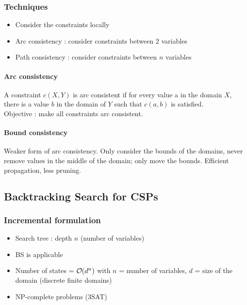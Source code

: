 \subsubsection{Techniques}

\begin{itemize}
\item Consider the constraints locally
\item Arc consistency : consider constraints between $2$ variables
\item Path consistency : consider constraints between $n$ variables
\end{itemize}

\paragraph{Arc consistency}

A constraint $c(X, Y)$ is arc consistent if for every value a in the domain $X$, there is a value $b$ in the domain of $Y$ such that $c(a,b)$ is satisfied.\\
Objective : make all constraints arc consistent.

\paragraph{Bound consistency}

Weaker form of arc consistency. Only consider the bounds of the domains, never remove values in the middle of the domain; only move the bounds. Efficient propagation, less pruning.

\subsection{Backtracking Search for CSPs}

\subsubsection{Incremental formulation}

\begin{itemize}
\item Search tree : depth $n$ (number of variables)
\item BS is applicable
\item Number of states = $\bigO (d^n)$ with $n$ = number of variables, $d$ = size of the domain (discrete finite domains)
\item NP-complete problems (3SAT) 
\end{itemize}

